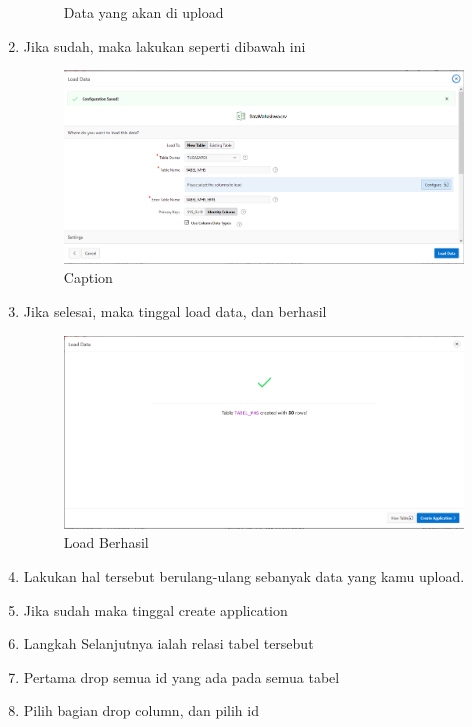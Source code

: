 \documentclass{article}
\begin{document}
\begin{enumerate}
\begin{figure}[!htbp]
        \caption{Data yang akan di upload}
    \end{figure}
\newpage
    \item Jika sudah, maka lakukan seperti dibawah ini
    \begin{figure}[!htbp]
        \centering
        \includegraphics[scale=0.3]{figure/load.PNG}
        \caption{Caption}
    \end{figure}
    \item Jika selesai, maka tinggal load data, dan berhasil
    \begin{figure}[!htbp]
        \centering
        \includegraphics[scale=0.3]{figure/loadberhasil.PNG}
        \caption{Load Berhasil}
    \end{figure}
    \item Lakukan hal tersebut berulang-ulang sebanyak data yang kamu upload.
\newpage
    \item Jika sudah maka tinggal create application
    \item Langkah Selanjutnya ialah relasi tabel tersebut
    \item Pertama drop semua id yang ada pada semua tabel
    \item Pilih bagian drop column, dan pilih id
    \begin{figure}[!htbp]
        \centering

\end{figure}
\end{enumerate}
\end{document}
